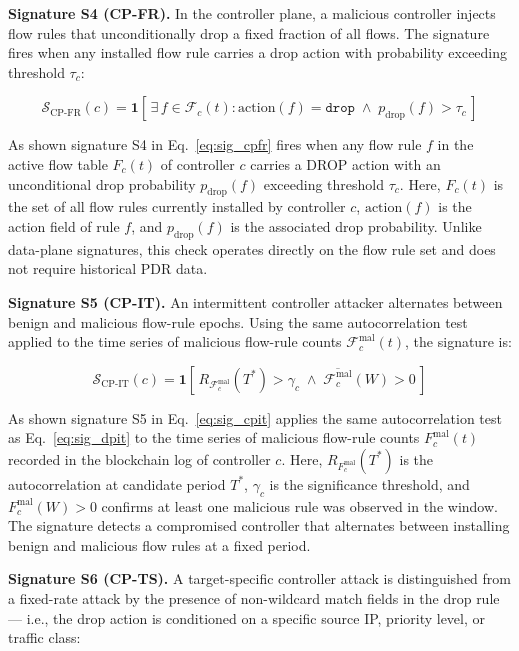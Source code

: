\documentclass[12pt, a4paper]{report}
\begin{document}
\textbf{Signature S4 (CP-FR).} In the controller plane, a malicious controller
injects flow rules that unconditionally drop a fixed fraction of all flows.
The signature fires when any installed flow rule carries a drop action with
probability exceeding threshold $\tau_c$:

\begin{equation}
\label{eq:sig_cpfr}
\mathcal{S}_{\text{CP-FR}}(c) =
\mathbf{1}\!\left[\,
\exists\,f \in \mathcal{F}_c(t) :
\mathrm{action}(f) = \texttt{drop} \;\wedge\;
p_{\text{drop}}(f) > \tau_c
\,\right]
\end{equation}

As shown signature S4 in Eq.~\eqref{eq:sig_cpfr} fires when any flow rule $f$ in the active flow table $F_c(t)$ of controller $c$ carries a DROP action with an unconditional drop probability $p_{\text{drop}}(f)$ exceeding threshold $\tau_c$. Here, $F_c(t)$ is the set of all flow rules currently installed by controller $c$, $\text{action}(f)$ is the action field of rule $f$, and $p_{\text{drop}}(f)$ is the associated drop probability. Unlike data-plane signatures, this check operates directly on the flow rule set and does not require historical PDR data.

\textbf{Signature S5 (CP-IT).} An intermittent controller attacker alternates
between benign and malicious flow-rule epochs. Using the same autocorrelation
test applied to the time series of malicious flow-rule counts
$\mathcal{F}_c^{\text{mal}}(t)$, the signature is:

\begin{equation}
\label{eq:sig_cpit}
\mathcal{S}_{\text{CP-IT}}(c) =
\mathbf{1}\!\left[\,
R_{\mathcal{F}_c^{\text{mal}}}(T^*) > \gamma_c \;\wedge\;
\overline{\mathcal{F}_c^{\text{mal}}}(W) > 0
\,\right]
\end{equation}

As shown signature S5 in Eq.~\eqref{eq:sig_cpit} applies the same autocorrelation test as Eq.~\eqref{eq:sig_dpit} to the time series of malicious flow-rule counts $F_c^{\text{mal}}(t)$ recorded in the blockchain log of controller $c$. Here, $R_{F_c^{\text{mal}}}(T^*)$ is the autocorrelation at candidate period $T^*$, $\gamma_c$ is the significance threshold, and $F_c^{\text{mal}}(W) > 0$ confirms at least one malicious rule was observed in the window. The signature detects a compromised controller that alternates between installing benign and malicious flow rules at a fixed period.

\textbf{Signature S6 (CP-TS).} A target-specific controller attack is
distinguished from a fixed-rate attack by the presence of non-wildcard match
fields in the drop rule --- i.e., the drop action is conditioned on a specific
source IP, priority level, or traffic class:
\end{document}

